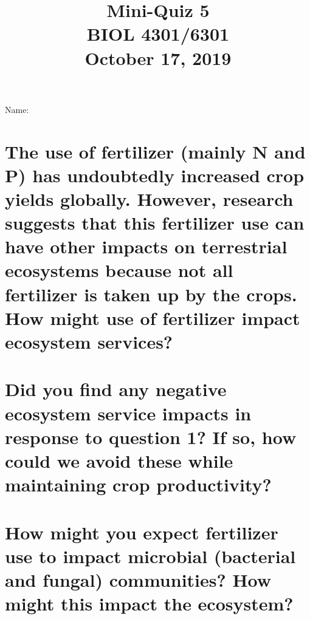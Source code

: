 \documentclass[12pt, notitlepage]{article}   	%
\title{
	\textbf{
		Mini-Quiz 5
	} \\
	\large BIOL 4301/6301 \\
	\large October 17, 2019 \\
}
\date{\vspace{-5ex}}
\def\wl{\par \vspace{\baselineskip}}
\begin{document}
{\selectfont %

\large{Name:}

{\let\newpage\relax\maketitle}

\section{\small{The use of fertilizer (mainly N and P) has undoubtedly increased
crop yields globally. However, research suggests that this fertilizer use can have other
impacts on terrestrial ecosystems because not all fertilizer is taken up by the crops.
How might use of fertilizer impact ecosystem services?}}

\wl
\wl
\wl
\wl
\wl
\wl
\wl
\wl
\wl

\section{\small{Did you find any negative ecosystem service impacts in response to question 1?
If so, how could we avoid these while maintaining crop productivity?}}

\newpage

\section{\small{How might you expect fertilizer use to impact microbial (bacterial and fungal)
communities? How might this impact the ecosystem?}}


} %
\end{document}
